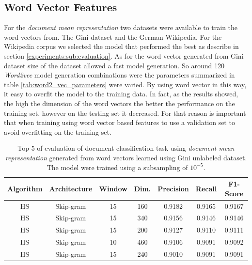 \subsection{Word Vector Features}

For the \textit{document mean representation} two datasets were available to
train the word vectors from. The Gini dataset and the German Wikipedia.
 For the Wikipedia corpus we selected the model that
performed the best as describe in section \ref{experiments:sub:evaluation}. 
As for the word vector generated from Gini dataset 
size of the dataset  allowed a fast model generation. So around 120
\textit{Word2vec} model generation  combinations were the parameters
summarized in table \ref{tab:word2_vec_parameters} were varied. By using word
vector in this way, it easy to overfit the model to the training data. In
fact, as the results showed, the high the dimension of the word vectors the
better the performance on the training set, however on the testing set it
decreased.  For that reason is important that when training using word vector
based features to use a validation set to avoid overfitting on the training
set. 

\begin{table}[!htpb]

  \centering
  \caption{Top-5 of evaluation of document classification task using
    \textit{document mean representation} generated from word vectors learned
  using Gini unlabeled dataset. The model were trained using a subsampling of
  $10^{-5}$.}
  \label{tab:w2v4tc_gini_w2v_evaluation}

\small
\begin{tabular}{|c|c|c|c|c|c|c|}
\hline
 Algorithm  &  Architecture  &  Window  &  Dim.  &  Precision  &    Recall  &  F1-Score  \\
\hline
\ac{HS}    &  Skip-gram     &      15  &   160  &   0.9182 &  0.9165  &  0.9167  \\
\ac{HS}    &  Skip-gram     &      15  &   340  &   0.9156  &  0.9146  &  0.9146  \\
\ac{HS}    &  Skip-gram     &      15  &   200  &   0.9127  &  0.9110  &  0.9111  \\
\ac{HS}    &  Skip-gram     &      10  &   460  &   0.9106  &  0.9091  &  0.9092  \\
\ac{HS}    &  Skip-gram     &      15  &   240  &   0.9010  &  0.9091  & 0.9091  \\
\hline
\end{tabular}
\end{table}



